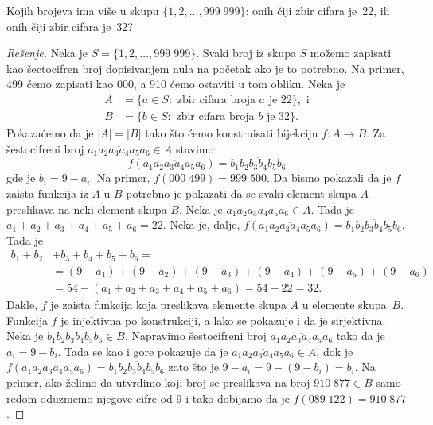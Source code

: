 \begin{EX}\label{ft08.ex.22-34}
  Kojih brojeva ima vi\v se u skupu $\{1, 2, \ldots, 999\;999\}$: onih \v ciji zbir cifara je~22, ili onih \v ciji zbir cifara je~32?
\end{EX}
\begin{proof}[Re\v senje]
  Neka je $S = \{1, 2, \ldots, 999\;999\}$. Svaki broj iz skupa $S$ mo\v zemo zapisati kao \v sectocifren broj dopisivanjem nula
  na po\v cetak ako je to potrebno. Na primer, 499 \'cemo zapisati kao 000, a 910 \'cemo ostaviti u tom obliku.
  Neka je
  \begin{align*}
    A &= \{ a \in S : \text{ zbir cifara broja $a$ je 22}\}, \text{ i}\\
    B &= \{ b \in S : \text{ zbir cifara broja $b$ je 32}\}.
  \end{align*}
  Pokaza\'cemo da je $|A| = |B|$ tako \v sto \'cemo konstruisati bijekciju $f : A \to B$.
  Za \v sestocifreni broj $\overline{a_1 a_2 a_3 a_4 a_5 a_6} \in A$ stavimo
  $$
    f(\overline{a_1 a_2 a_3 a_4 a_5 a_6}) = \overline{b_1 b_2 b_3 b_4 b_5 b_6}
  $$
  gde je $b_i = 9 - a_i$. Na primer, $f(000\;499) = 999\;500$.
  Da bismo pokazali da je $f$ zaista funkcija iz $A$ u $B$ potrebno je pokazati da se svaki element skupa $A$ preslikava
  na neki element skupa $B$. Neka je \hbox{$\overline{a_1 a_2 a_3 a_4 a_5 a_6} \in A$}. Tada je
  $a_1 + a_2 + a_3 + a_4 + a_5 + a_6 = 22$. Neka je, dalje,
  $f(\overline{a_1 a_2 a_3 a_4 a_5 a_6}) = \overline{b_1 b_2 b_3 b_4 b_5 b_6}$. Tada je
  \begin{align*}
  b_1 + b_2 &+ b_3 + b_4 + b_5 + b_6 = \\
  &= (9 - a_1) + (9 - a_2) + (9 - a_3) + (9 - a_4) + (9 - a_5) + (9 - a_6)\\
  &= 54 - (a_1 + a_2 + a_3 + a_4 + a_5 + a_6) = 54 - 22 = 32.
  \end{align*}
  Dakle, $f$ je zaista funkcija koja preslikava elemente skupa $A$ u elemente skupa~$B$.
  Funkcija $f$ je injektivna po konstrukciji, a lako se pokazuje i da je sirjektivna. Neka je
  $\overline{b_1 b_2 b_3 b_4 b_5 b_6} \in B$. Napravimo \v sestocifreni broj
  $\overline{a_1 a_2 a_3 a_4 a_5 a_6}$ tako da je $a_i = 9 - b_i$. Tada se kao i gore pokazuje
  da je $\overline{a_1 a_2 a_3 a_4 a_5 a_6} \in A$, dok je
  $f(\overline{a_1 a_2 a_3 a_4 a_5 a_6}) = \overline{b_1 b_2 b_3 b_4 b_5 b_6}$
  zato \v sto je $9 - a_i = 9 - (9 - b_i) = b_i$. Na primer, ako \v zelimo da utvrdimo koji broj se preslikava
  na broj $910\;877 \in B$ samo redom oduzmemo njegove cifre od 9 i tako dobijamo da je
  $f(089\;122) = 910\;877$.
\end{proof}

